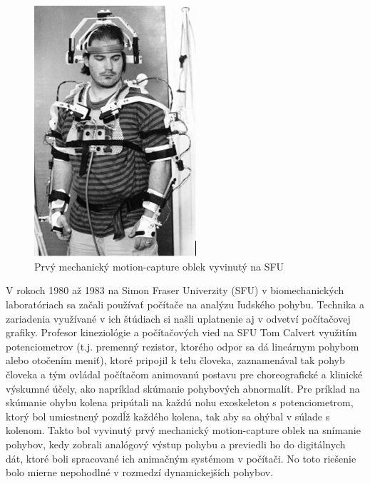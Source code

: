 \begin{figure}[!htbp]
  \centering
  \includegraphics[width=6cm]{img/firstMechMocapSuit.jpg}
  \caption{Prvý mechanický motion-capture oblek vyvinutý na SFU}
  \label{mechMocapFig}
\end{figure}

V rokoch 1980 až 1983 na Simon Fraser Univerzity (SFU) v biomechanických laboratóriach sa začali používať počítače na analýzu ľudského pohybu. Technika a zariadenia využívané v ich štúdiach si našli uplatnenie aj v odvetví počítačovej grafiky. Profesor kineziológie a počítačových vied na SFU Tom Calvert využitím potenciometrov (t.j. premenný rezistor, ktorého odpor sa dá lineárnym pohybom alebo otočením meniť), ktoré pripojil k telu človeka, zaznamenával tak pohyb človeka a tým ovládal počítačom animovanú postavu pre choreografické a klinické výskumné účely, ako napríklad skúmanie pohybových abnormalít. Pre príklad na skúmanie ohybu kolena pripútali na každú nohu exoskeleton s potenciometrom, ktorý bol umiestnený pozdĺž každého kolena, tak aby sa ohýbal v súlade s kolenom. Takto bol vyvinutý prvý mechanický motion-capture oblek na snímanie pohybov, kedy zobrali analógový výstup pohybu a previedli ho do digitálnych dát, ktoré boli spracované ich animačným systémom v počítači. No toto riešenie bolo mierne nepohodlné v rozmedzí dynamickejších pohybov.

